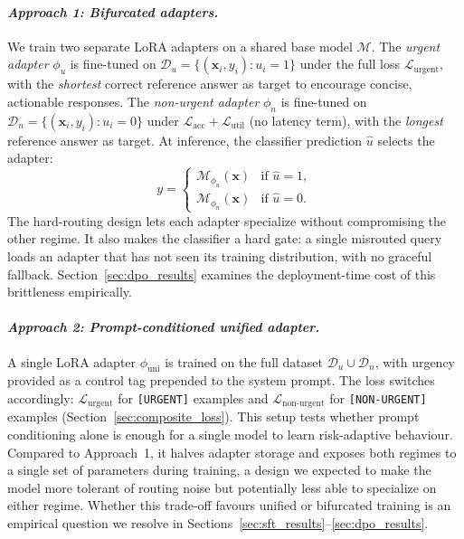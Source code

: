 \documentclass{article}
\begin{document}
\paragraph{\textit{Approach 1: Bifurcated adapters.}}
We train two separate LoRA adapters on a shared base model $\mathcal{M}$. The \textit{urgent adapter} $\phi_u$ is fine-tuned on $\mathcal{D}_u = \{(\mathbf{x}_i, y_i) : u_i = 1\}$ under the full loss $\mathcal{L}_{\text{urgent}}$, with the \emph{shortest} correct reference answer as target to encourage concise, actionable responses. The \textit{non-urgent adapter} $\phi_n$ is fine-tuned on $\mathcal{D}_n = \{(\mathbf{x}_i, y_i) : u_i = 0\}$ under $\mathcal{L}_{\text{acc}} + \mathcal{L}_{\text{util}}$ (no latency term), with the \emph{longest} reference answer as target. At inference, the classifier prediction $\hat{u}$ selects the adapter:
\begin{equation}
    y = \begin{cases}
        \mathcal{M}_{\phi_u}(\mathbf{x}) & \text{if } \hat{u} = 1, \\
        \mathcal{M}_{\phi_n}(\mathbf{x}) & \text{if } \hat{u} = 0.
    \end{cases}
\end{equation}
The hard-routing design lets each adapter specialize without compromising the other regime. It also makes the classifier a hard gate: a single misrouted query loads an adapter that has not seen its training distribution, with no graceful fallback. Section~\ref{sec:dpo_results} examines the deployment-time cost of this brittleness empirically.

\paragraph{\textit{Approach 2: Prompt-conditioned unified adapter.}}
A single LoRA adapter $\phi_{\text{uni}}$ is trained on the full dataset $\mathcal{D}_u \cup \mathcal{D}_n$, with urgency provided as a control tag prepended to the system prompt. The loss switches accordingly: $\mathcal{L}_{\text{urgent}}$ for \texttt{[URGENT]} examples and $\mathcal{L}_{\text{non-urgent}}$ for \texttt{[NON-URGENT]} examples (Section~\ref{sec:composite_loss}). This setup tests whether prompt conditioning alone is enough for a single model to learn risk-adaptive behaviour. Compared to Approach~1, it halves adapter storage and exposes both regimes to a single set of parameters during training, a design we expected to make the model more tolerant of routing noise but potentially less able to specialize on either regime. Whether this trade-off favours unified or bifurcated training is an empirical question we resolve in Sections~\ref{sec:sft_results}--\ref{sec:dpo_results}.
\end{document}
